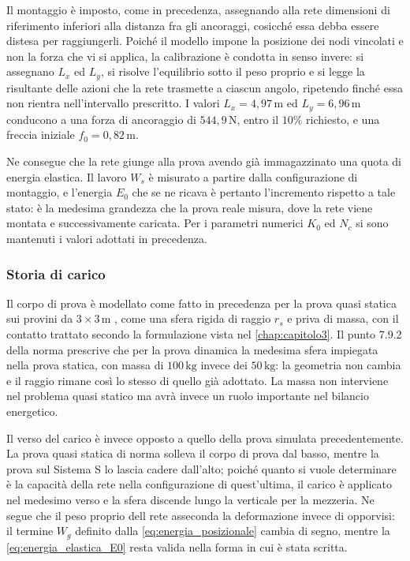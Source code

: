Il montaggio è imposto, come in precedenza, assegnando alla rete dimensioni di riferimento inferiori alla distanza fra gli ancoraggi, cosicché essa debba essere distesa per raggiungerli. Poiché il modello impone la posizione dei nodi vincolati e non la forza che vi si applica, la calibrazione è condotta in senso invere: si assegnano $L_x$ ed $L_y$, si risolve l'equilibrio sotto il peso proprio e si legge la risultante delle azioni che la rete trasmette a ciascun angolo, ripetendo finché essa non rientra nell'intervallo prescritto. I valori $L_x = 4,97\,\text{m}$ ed $L_y = 6,96\,\text{m}$ conducono a una forza di ancoraggio di $544,9\,\text{N}$, entro il $10\%$ richiesto, e una freccia iniziale $f_0 = 0,82\,\text{m}$.

Ne consegue che la rete giunge alla prova avendo già immagazzinato una quota di energia elastica. Il lavoro $W_s$ è misurato a partire dalla configurazione di montaggio, e l'energia $E_0$ che se ne ricava è pertanto l'incremento rispetto a tale stato: è la medesima grandezza che la prova reale misura, dove la rete viene montata e successivamente caricata. Per i parametri numerici $K_0$ ed $N_c$ si sono mantenuti i valori adottati in precedenza. 

\subsubsection{Storia di carico}
\label{sec:storia_carico_5x7}

Il corpo di prova è modellato come fatto in precedenza per la prova quasi statica sui provini da $3\times3\,\text{m}$ , come una sfera rigida di raggio $r_s$ e priva di massa, con il contatto trattato secondo la formulazione vista nel \cref{chap:capitolo3}. Il punto 7.9.2 della norma prescrive che per la prova dinamica la medesima sfera impiegata nella prova statica, con massa di $100\,\text{kg}$ invece dei $50\,\text{kg}$: la geometria non cambia e il raggio rimane così lo stesso di quello già adottato. La massa non interviene nel problema quasi statico ma avrà invece un ruolo importante nel bilancio energetico. 

Il verso del carico è invece opposto a quello della prova simulata precedentemente. La prova quasi statica di norma solleva il corpo di prova dal basso, mentre la prova sul Sistema S lo lascia cadere dall'alto; poiché quanto si vuole determinare è la capacità della rete nella configurazione di quest'ultima, il carico è applicato nel medesimo verso e la sfera discende lungo la verticale per la mezzeria. Ne segue che il peso proprio dell rete asseconda la deformazione invece di opporvisi: il termine $W_g$ definito dalla \eqref{eq:energia_posizionale} cambia di segno, mentre la \eqref{eq:energia_elastica_E0} resta valida nella forma in cui è stata scritta.

